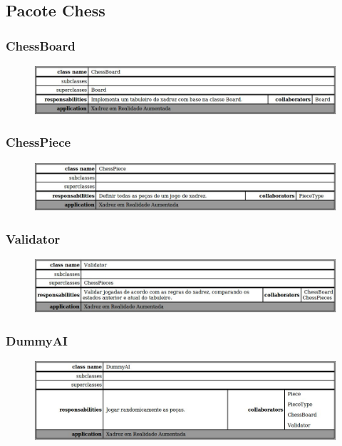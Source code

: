 \documentclass[a4paper,12pt]{book}
\begin{document}
    \subsection{Pacote Chess}
    \label{subsec:crcpacotechess}
      \subsubsection{ChessBoard}
      \label{subsubsec:crcchessboard}
      \begin{figure}[H]
	    \centering
	    \includegraphics[width=1.0\textwidth]{crc/ChessBoard}
	    \end{figure}
      \subsubsection{ChessPiece}
      \label{subsubsec:crcchesspiece}
      \begin{figure}[H]
	    \centering
	    \includegraphics[width=1.0\textwidth]{crc/ChessPieces}
	    \end{figure}
      \subsubsection{Validator}
      \label{subsec:crcvalidator}
      \begin{figure}[H]
	    \centering
	    \includegraphics[width=1.0\textwidth]{crc/Validator}
	    \end{figure}
      \subsubsection{DummyAI}
      \label{subsec:crcdummyai}
      \begin{figure}[H]
	    \centering
	    \includegraphics[width=1.0\textwidth]{crc/DummyAI}
	    \end{figure}
\end{document}
